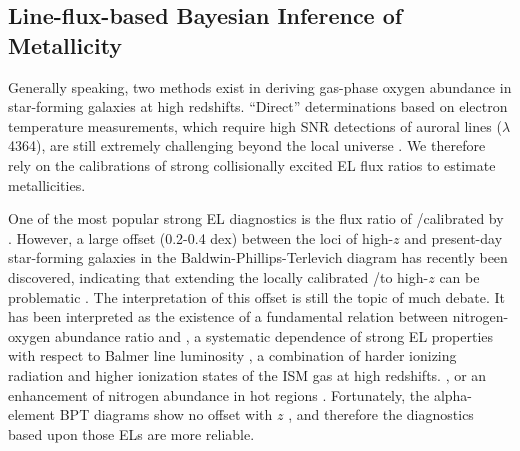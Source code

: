 \subsection{Line-flux-based Bayesian Inference of Metallicity}\label{subsect:bayes}



Generally speaking, two methods exist in deriving gas-phase oxygen abundance in star-forming galaxies at high redshifts.
``Direct'' determinations based on electron temperature measurements, which require high SNR
detections of auroral lines (\eg \OIII$\lambda$4364), are still extremely challenging beyond the local universe \citep[see][for a
rare example]{Sanders:2016uo}.
We therefore rely on the calibrations of strong collisionally excited EL flux ratios to estimate metallicities.

One of the most popular strong EL diagnostics is the flux ratio of \NII/\Ha calibrated by \citet{2004MNRAS.348L..59P}.  However, a
large offset (0.2-0.4 dex) between the loci of high-$z$ and present-day star-forming galaxies in the Baldwin-Phillips-Terlevich
\citep[BPT,][]{Baldwin:1981ev} diagram has recently been discovered, indicating that extending the locally calibrated \NII/\Ha to
high-$z$ can be problematic \citep{2015ApJ...801...88S,Sanders:2015gk}.  The interpretation of this offset is still the topic of
much debate. It has been interpreted as the existence of a fundamental relation between nitrogen-oxygen abundance ratio and \Mstar
\citep{Masters:2016vr}, a systematic dependence of strong EL properties with respect to Balmer line luminosity
\citep{Cowie:2016fv}, a combination of harder ionizing radiation and higher ionization states of the ISM gas at high redshifts.
\citep{2014ApJ...795..165S}, or an enhancement of nitrogen abundance in hot \HII regions \citep{Pilyugin:2010bx}.  
Fortunately, the alpha-element BPT diagrams show no offset with $z$ \citep{2015ApJ...801...88S,Sanders:2015gk}, and therefore the 
diagnostics based upon those ELs are more reliable.

